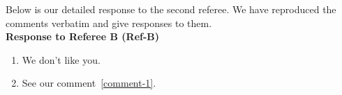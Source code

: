 Below is our detailed response to the second referee. We have reproduced the comments verbatim and give responses to them.\\

\bigskip
\noindent\textbf{Response to Referee B (Ref-B)}
%

\begin{enumerate}[start=1,label={\color{black}(\bfseries Ref-B \arabic*):}]
	\item {}\label{comment-1}
	
	We don't like you.
	
	\item {}
	
	See our comment~\ref{comment-1}.
\end{enumerate}
